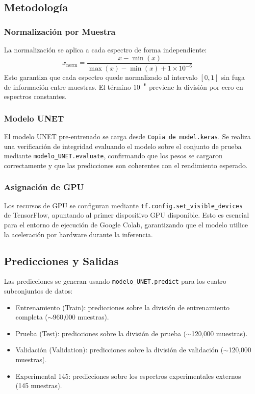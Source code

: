 \documentclass{article}
\begin{document}
\subsection{Metodología}

\subsubsection{Normalización por Muestra}
La normalización se aplica a cada espectro de forma independiente:
\[
x_{\text{norm}} = \frac{x - \min(x)}{\max(x) - \min(x) + 1 \times 10^{-6}}
\]
Esto garantiza que cada espectro quede normalizado al intervalo $[0, 1]$ sin fuga de información entre muestras. El término $10^{-6}$ previene la división por cero en espectros constantes.

\subsubsection{Modelo UNET}
El modelo UNET pre-entrenado se carga desde \texttt{Copia de model.keras}. Se realiza una verificación de integridad evaluando el modelo sobre el conjunto de prueba mediante \texttt{modelo\_UNET.evaluate}, confirmando que los pesos se cargaron correctamente y que las predicciones son coherentes con el rendimiento esperado.

\subsubsection{Asignación de GPU}
Los recursos de GPU se configuran mediante \texttt{tf.config.set\_visible\_devices} de TensorFlow, apuntando al primer dispositivo GPU disponible. Esto es esencial para el entorno de ejecución de Google Colab, garantizando que el modelo utilice la aceleración por hardware durante la inferencia.

\subsection{Predicciones y Salidas}

Las predicciones se generan usando \texttt{modelo\_UNET.predict} para los cuatro subconjuntos de datos:
\begin{itemize}
\item Entrenamiento (Train): predicciones sobre la división de entrenamiento completa ($\sim$960,000 muestras).
\item Prueba (Test): predicciones sobre la división de prueba ($\sim$120,000 muestras).
\item Validación (Validation): predicciones sobre la división de validación ($\sim$120,000 muestras).
\item Experimental 145: predicciones sobre los espectros experimentales externos (145 muestras).
\end{itemize}
\end{document}
